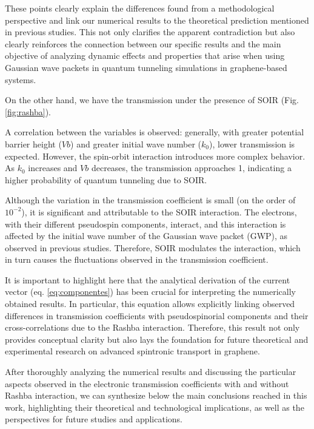These points clearly explain the differences found from a methodological perspective and link our numerical results to the theoretical prediction mentioned in previous studies.
This not only clarifies the apparent contradiction but also clearly reinforces the connection between our specific results and the main objective of analyzing dynamic effects and properties that arise when using Gaussian wave packets in quantum tunneling simulations in graphene-based systems.

On the other hand, we have the transmission under the presence of SOIR (Fig.\ref{fig:rashba}).

A correlation between the variables is observed: generally, with greater potential barrier height ($Vb$) and greater initial wave number ($k_0$), lower transmission is expected.
However, the spin-orbit interaction introduces more complex behavior.
As $k_0$ increases and $Vb$ decreases, the transmission approaches 1, indicating a higher probability of quantum tunneling due to SOIR\@.

Although the variation in the transmission coefficient is small (on the order of $10^{-2}$), it is significant and attributable to the SOIR interaction. The electrons, with their different pseudospin components, interact, and this interaction is affected by the initial wave number of the Gaussian wave packet (GWP), as observed in previous studies\cite{Serna2019}.
Therefore, SOIR modulates the interaction, which in turn causes the fluctuations observed in the transmission coefficient.

It is important to highlight here that the analytical derivation of the current vector (eq. \ref{eq:componentes}) has been crucial for interpreting the numerically obtained results.
In particular, this equation allows explicitly linking observed differences in transmission coefficients with pseudospinorial components and their cross-correlations due to the Rashba interaction.
Therefore, this result not only provides conceptual clarity but also lays the foundation for future theoretical and experimental research on advanced spintronic transport in graphene.

After thoroughly analyzing the numerical results and discussing the particular aspects observed in the electronic transmission coefficients with and without Rashba interaction, we can synthesize below the main conclusions reached in this work, highlighting their theoretical and technological implications, as well as the perspectives for future studies and applications.
